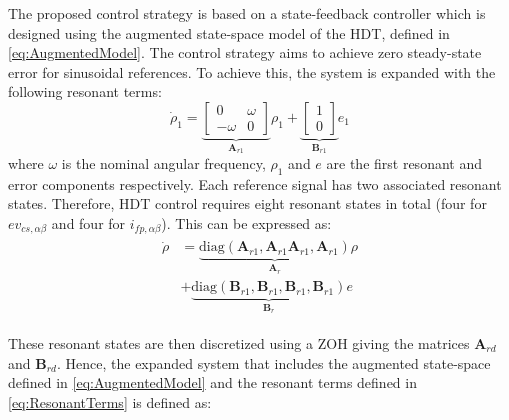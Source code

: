 The proposed control strategy is based on a state-feedback controller which is designed using the augmented state-space model of the HDT, defined in \eqref{eq:AugmentedModel}. The control strategy aims to achieve zero steady-state error for sinusoidal references. To achieve this, the system is expanded with the following resonant terms:
\begin{equation}
    \dot{\rho}_1 = 
    \underbrace{
    \begin{bmatrix}
        0 & \omega \\
        -\omega & 0
    \end{bmatrix}
    }_{\mathbf{A}_{r1}}
    \rho_1 + 
    \underbrace{
    \begin{bmatrix}
        1\\
        0
    \end{bmatrix}
    }_{\mathbf{B}_{r1}}
    e_1
\end{equation}
where $\omega$ is the nominal angular frequency, $\rho_1$ and $e$ are the first resonant and error components respectively. Each reference signal has two associated resonant states. Therefore, HDT control requires eight resonant states in total (four for $ev_{cs,\alpha\beta}$ and four for $i_{fp,\alpha\beta}$). This can be expressed as:
\begin{align}
    \begin{aligned}
        \dot{\rho} &= \underbrace{\text{diag}(\mathbf{A}_{r1}, \mathbf{A}_{r1} \mathbf{A}_{r1}, \mathbf{A}_{r1})}_{\mathbf{A}_{r}}\rho\\
        &+ \underbrace{\text{diag}(\mathbf{B}_{r1}, \mathbf{B}_{r1}, \mathbf{B}_{r1}, \mathbf{B}_{r1})}_{\mathbf{B}_{r}}e\label{eq:ResonantTerms}
    \end{aligned}
\end{align}

These resonant states are then discretized using a ZOH giving the matrices $\mathbf{A}_{rd}$ and $\mathbf{B}_{rd}$. Hence, the expanded system that includes the augmented state-space defined in \eqref{eq:AugmentedModel} and the resonant terms defined in \eqref{eq:ResonantTerms} is defined as:

